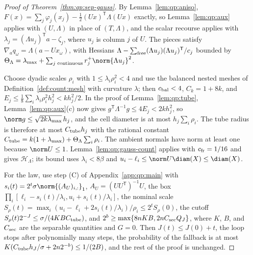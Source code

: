 \begin{proof}[Proof of Theorem~\ref{thm:qp:sep-gauss}]
By Lemma~\ref{lem:qp:aniso}, $F(x)=\sum_j\varphi_j(x_j)-\frac12(Ux)^{\mathsf T}\Lambda(Ux)$
exactly, so Lemma~\ref{lem:qp:aux} applies with $(U,\Lambda)$ in place of
$(T,\Lambda)$, and the scalar recourse applies with
$\lambda_j=(\Lambda u_j)^{\mathsf T} a-\zeta_j$, where $u_j$ is column $j$ of $U$. The
pieces satisfy $\nabla_aq_\omega=\Lambda(a-Ux_\omega)$, with Hessians
$\Lambda-\sum_{\rm free}(\Lambda u_j)(\Lambda u_j)^{\mathsf T}/c_j$ bounded by
$\Theta_\Lambda=\lambda_{\max}+\sum_{j\text{ continuous}}r_j^+\norm{\Lambda u_j}^2$.

Choose dyadic scales $\rho_i$ with $1\le\lambda_i\rho_i^2<4$ and use the
balanced nested meshes of Definition~\ref{def:count:mesh} with curvature
$\lambda$; then $c_{\rm bal}<4$, $C_k=1+8k$, and
$E_j\le\frac18\sum_i\lambda_i\rho_i^2h_j^2<kh_j^2/2$. In the proof of
Lemma~\ref{lem:qp:tube}, Lemma~\ref{lem:qp:aux}(c) now gives
$g^{\mathsf T}\Lambda^{-1}g\le4E_j<2kh_j^2$, so $\norm g\le\sqrt{2k\lambda_{\max}}\,h_j$,
and the cell diameter is at most $h_j\sum_i\rho_i$. The tube radius is
therefore at most $C_{\rm tube}h_j$ with the rational constant
$C_{\rm tube}=k(1+\lambda_{\max})+\Theta_\Lambda\sum_i\rho_i$. The ambient
normals have norm at least one because $\norm U\le1$. Lemma~\ref{lem:qp:gauss-count}
applies with $c_{\rm fr}=1/16$ and gives $\mathcal H_\Lambda$; its bound uses
$\lambda_i<8\beta$ and $u_i-\ell_i\le\norm U\diam(X)\le\diam(X)$.

For the law, use step (C) of Appendix~\ref{app:qp:main} with
$s_i(t)=2^t\sigma\norm{(A_U)_{i,:}}_1$, $A_U=(UU^{\mathsf T})^{-1}U$, the box
$\prod_i[\ell_i-s_i(t)/\lambda_i,u_i+s_i(t)/\lambda_i]$, the nominal scale
$S_\rho(t)=\max_i(u_i-\ell_i+2s_i(t)/\lambda_i)/\rho_i\le2^tS_\rho(0)$, the
cutoff $S_\rho(t)2^{-J}\le\sigma/(4KBC_{\rm tube})$, and
$2^b\ge\max\{8nKB,2nC_{\rm sec}Q_J\}$, where $K$, $B$, and $C_{\rm sec}$ are the
separable quantities and $G=0$. Then $J(t)\le J(0)+t$, the loop stops after
polynomially many steps, the probability of the fallback is at most
$K(C_{\rm tube}h_J/\sigma+2n2^{-b})\le1/(2B)$, and the rest of the proof is
unchanged.
\end{proof}
